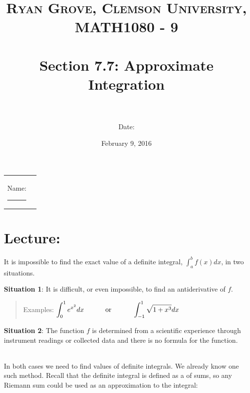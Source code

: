 \documentclass[paper=a4, fontsize=11pt]{scrartcl} %
\title{	
\normalfont \normalsize 
\textsc{Ryan Grove, Clemson University, MATH1080 - 9} \\ [25pt] %
\horrule{0.5pt} \\[0.4cm] %
\huge Section 7.7: Approximate Integration \\ %
\horrule{2pt} \\[0.5cm] %
}
\author{Date:} %
\date{\normalsize February 9, 2016} %
\numberwithin{equation}{section} %
\numberwithin{figure}{section} %
\numberwithin{table}{section} %
\newcommand{\ds}{\displaystyle}
\begin{document}
\maketitle %

\begin{flushleft}
\begin{tabular}{l l}
Name: \rule{3.2in}{.01cm}  & {}%
\end{tabular}
\end{flushleft}


\section*{\textbf{Lecture:}}

It is impossible to find the exact value of a definite integral, $\ds\int_a^b f(x) dx$, in two situations.\\
\indent

\textbf{Situation 1}: It is difficult, or even impossible, to find an antiderivative of $f$.
\begin{quote}
\flushleft
\hspace{0.53in} Examples: \quad \quad \quad $\ds\int_0^1 e^{x^2}dx \quad \hspace{0.25in} \text{ or } \hspace{0.25in} \quad \ds\int_{-1}^1 \ds\sqrt{1+x^3}dx$
\end{quote}
\indent

\textbf{Situation 2}: The function $f$ is determined from a scientific experience through instrument readings or collected data and there is no formula for the function.\\
\indent

\indent\\

In both cases we need to find \underline{\hspace{1.25in}} values of definite integrals. We already know one such method. Recall that the definite integral is defined as a \underline{\hspace{1in}} of \underline{\hspace{1.25in}} sums, so any Riemann sum could be used as an approximation to the integral:\\
\indent
\end{document}
